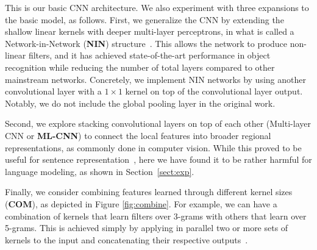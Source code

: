 This is our basic CNN architecture. We also experiment with three
expansions to the basic model, as follows. First, we generalize the CNN by
extending the shallow linear kernels with deeper multi-layer
perceptrons, in what is called a Network-in-Network ({\bf NIN})
structure~\cite{lin2013network}. %
This allows the network to produce non-linear filters, and it has achieved
state-of-the-art performance in object recognition while reducing the
number of total layers compared to other mainstream networks. Concretely, we implement NIN networks by using another convolutional layer with a $1 \times 1$ kernel
on top of the convolutional layer output. Notably, we do not include the global pooling layer in the original work. 

Second, we explore stacking convolutional layers on top of each other (Multi-layer CNN or \textbf{ML-CNN}) to connect the local features into broader regional representations, as commonly done in computer
vision. While this proved to be useful for sentence
representation~\cite{Kalchbrenner2014conv}, here we have found it to be rather harmful for language modeling, as shown in Section~\ref{sect:exp}.


Finally, we consider combining features learned through different kernel sizes (\textbf{COM}), as depicted in Figure \ref{fig:combine}. For example, we can have a combination of kernels that learn filters over 3-grams with others that learn over 5-grams. This is achieved simply by applying in parallel two or more sets of kernels to the input and concatenating their respective outputs~\cite{kim2014sentence}.%


